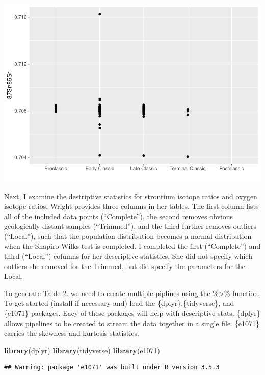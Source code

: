 \documentclass[]{article}
\newenvironment{Shaded}{\begin{snugshade}}{\end{snugshade}}
\newcommand{\KeywordTok}[1]{\textcolor[rgb]{0.13,0.29,0.53}{\textbf{#1}}}
\newcommand{\NormalTok}[1]{#1}
\begin{document}
\includegraphics{img/unnamed-chunk-2-1.pdf}

Next, I examine the destriptive statistics for strontium isotope ratios
and oxygen isotope ratios. Wright provides three columns in her tables.
The first column lists all of the included data points (``Complete''),
the second removes obvious geologically distant samples (``Trimmed''),
and the third further removes outliers (``Local''), such that the
population distribution becomes a normal distribution when the
Shapiro-Wilks test is completed. I completed the first (``Complete'')
and third (``Local'') columns for her descriptive statistics. She did
not specify which outliers she removed for the Trimmed, but did specify
the parameters for the Local.

To generate Table 2. we need to create multiple piplines using the
\%\textgreater{}\% function. To get started (install if necessary and)
load the \{dplyr\},\{tidyverse\}, and \{e1071\} packages. Eacy of these
packages will help with descriptive stats. \{dplyr\} allows pipelines to
be created to stream the data together in a single file. \{e1071\}
carries the skewness and kurtosis statistics.

\begin{Shaded}
\begin{Highlighting}[]
\KeywordTok{library}\NormalTok{(dplyr)}
\KeywordTok{library}\NormalTok{(tidyverse)}
\KeywordTok{library}\NormalTok{(e1071)}
\end{Highlighting}
\end{Shaded}

\begin{verbatim}
## Warning: package 'e1071' was built under R version 3.5.3
\end{verbatim}
\end{document}

